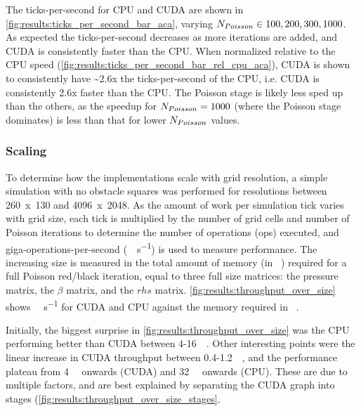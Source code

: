 The ticks-per-second for CPU and CUDA are shown in \cref{fig:results:ticks_per_second_bar_aca}, varying $N_{Poisson} \in {100, 200, 300, 1000}$.
As expected the ticks-per-second decreases as more iterations are added, and CUDA is consistently faster than the CPU.
When normalized relative to the CPU speed (\cref{fig:results:ticks_per_second_bar_rel_cpu_aca}), CUDA is shown to consistently have \textasciitilde{}2.6x the ticks-per-second of the CPU, i.e. CUDA is consistently 2.6x faster than the CPU. 
The Poisson stage is likely less sped up than the others, as the speedup for $N_{Poisson}{} = 1000$ (where the Poisson stage dominates) is less than that for lower $N_{Poisson}{}$ values.

\subsubsection{Scaling}
To determine how the implementations scale with grid resolution, a simple simulation with no obstacle squares was performed for resolutions between 260~x~130 and 4096~x~2048.
As the amount of work per simulation tick varies with grid size, each tick is multiplied by the number of grid cells and number of Poisson iterations to determine the number of operations (\si{op}s) executed, and  giga-operations-per-second (\si{\giga\op\per\second}) is used to measure performance.
The increasing size is measured in the total amount of memory (in \si{\mega\byte}) required for a full Poisson red/black iteration, equal to three full size matrices: the pressure matrix, the $\beta$ matrix, and the $rhs$ matrix.
\cref{fig:results:throughput_over_size} shows \si{\giga\op\per\second} for CUDA and CPU against the memory required in \si{\mega\byte}.



Initially, the biggest surprise in \cref{fig:results:throughput_over_size} was the CPU performing better than CUDA between 4-\SI{16}{\mega\byte}.
Other interesting points were the linear increase in CUDA throughput between 0.4-\SI{1.2}{\mega\byte}, and the performance plateau from \SI{4}{\mega\byte} onwards (CUDA) and \SI{32}{\mega\byte} onwards (CPU).
These are due to multiple factors, and are best explained by separating the CUDA graph into stages (\cref{fig:results:throughput_over_size_stages}.

